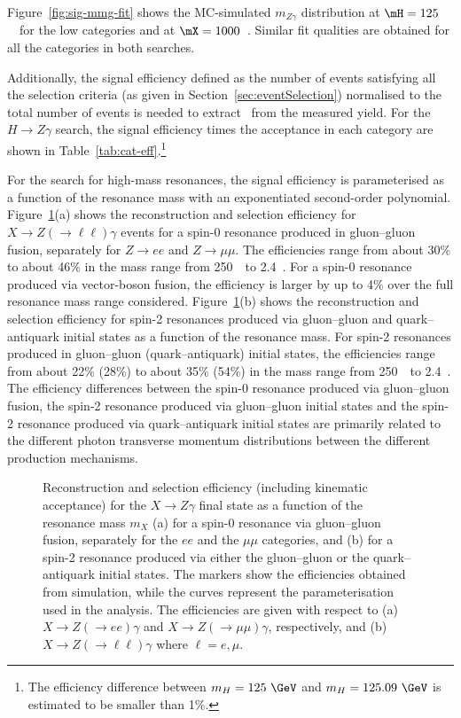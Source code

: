 Figure~\ref{fig:sig-mmg-fit} shows the MC-simulated $m_{Z\gamma}$ distribution at 
$\mH = 125$~\GeV\ for the low \ptt categories and at $\mX = 1000$~\GeV. 
Similar fit qualities are obtained for all the categories in both searches.

Additionally, the signal efficiency defined as the number of events satisfying all the selection 
criteria (as given in Section~\ref{sec:eventSelection}) normalised to the
total number of events is needed to extract \sigbr ~from the measured yield.
For the $H\to Z\gamma$ search,
the signal efficiency times the acceptance in each category are shown in 
Table~\ref{tab:cat-eff}.\footnote{The efficiency difference between $m_H = 125~\GeV$ and
$m_H = 125.09~\GeV$ is estimated to be smaller than 1\%.}  

For the search for high-mass resonances, the signal efficiency is parameterised as a function 
of the resonance mass with an exponentiated second-order polynomial. 
Figure~\ref{fig:efficiency}(a) shows the
reconstruction and selection efficiency for $X\to Z(\to\ell\ell)\gamma$ events for a spin-0 resonance
produced in gluon--gluon fusion, separately for $Z\to ee$ and $Z\to\mu\mu$. 
The efficiencies range from about 30\% to about 46\% in the mass range from
250~\GeV\ to 2.4~\TeV. For a spin-0
resonance produced via vector-boson fusion, the efficiency is larger by up to 4\% over the full
resonance mass range considered.
Figure~\ref{fig:efficiency}(b) shows the reconstruction and selection efficiency for 
spin-2 resonances produced via gluon--gluon and quark--antiquark initial states 
as a function of the resonance mass. 
For spin-2 resonances
produced in gluon--gluon (quark--antiquark) initial states, the efficiencies range from about 22\% (28\%) to about 
35\% (54\%) in the mass range from 250~\GeV\ to 2.4~\TeV.
The efficiency differences between the spin-0 resonance
produced via gluon--gluon fusion, the spin-2 resonance produced via gluon--gluon initial states
and the spin-2 resonance produced via quark--antiquark initial states are primarily related to
the different photon transverse momentum distributions between the different production mechanisms.

\begin{figure}
\begin{center}
%
\end{center}
\caption{Reconstruction and selection efficiency (including kinematic acceptance) for the 
$X\to Z\gamma$ final state as a function of the resonance mass $m_X$ (a) for
a spin-0 resonance via gluon--gluon fusion, separately for the $ee$ and the 
$\mu\mu$ categories, and 
(b) for a spin-2 resonance produced via either the gluon--gluon or the quark--antiquark 
initial states.
The markers show the efficiencies obtained from simulation, while the curves represent the 
parameterisation used in the analysis. The efficiencies are given with respect to (a)
$X\to Z(\to ee)\gamma$ and $X\to Z(\to \mu\mu)\gamma$, respectively, and (b) 
$X\to Z(\to \ell\ell)\gamma$ where $\ell = e, \mu$.}
\label{fig:efficiency}
\end{figure}



